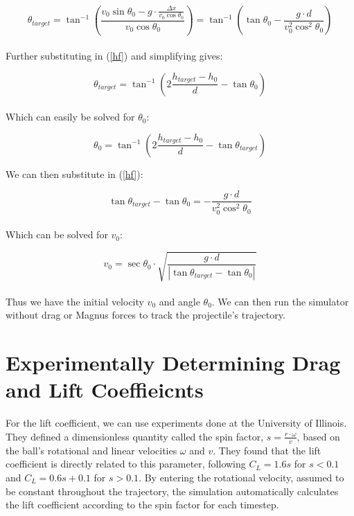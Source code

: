 \documentclass[a4paper]{article}
\begin{document}
	\begin{equation}
		\theta_{target} = \tan^{-1} \left( \frac{v_0 \sin \theta_0 - g \cdot \frac{\Delta x}{v_0 \cos \theta_0}}{v_0 \cos \theta_0} \right)
		 = \tan^{-1} \left( \tan \theta_0 - \frac{g \cdot d}{v_0^2 \cos^2 \theta_0} \right)
	\end{equation}
	\\
	Further substituting in (\ref{hf}) and simplifying gives:
	
	\begin{equation}
		\theta_{target} = \tan^{-1} \left( 2 \frac{h_{target} - h_0}{d} - \tan \theta_0 \right)
	\end{equation}
	\\
	Which can easily be solved for $ \theta_0 $:
	
	\begin{equation}
		\theta_0 = \tan^{-1} \left( 2 \frac{h_{target} - h_0}{d} - \tan \theta_{target} \right)
	\end{equation}
	
	\newpage
	We can then substitute in (\ref{hf}):
	
	\begin{equation}
		\tan \theta_{target} - \tan \theta_0 = - \frac{g \cdot d}{v_0^2 \cos^2 \theta_0}
	\end{equation}
	\\
	Which can be solved for $ v_0 $:
	
	\begin{equation}
		v_0 = \sec \theta_0 \cdot \sqrt{\frac{g \cdot d}{\left| \tan \theta_{target} - \tan \theta_0 \right|}}
	\end{equation}
	\\
	Thus we have the initial velocity $ v_0 $ and angle $ \theta_0 $. We can then run the simulator without drag or Magnus forces to track the projectile's trajectory.\\
	
	
	\section*{Experimentally Determining Drag and Lift Coeffieicnts}
	
	For the lift coefficient, we can use experiments done at the University of Illinois. They defined a dimensionless quantity called the spin factor, $ s = \frac{r \cdot \omega}{v} $, based on the ball's rotational and linear velocities $ \omega $ and $ v $. They found that the lift coefficient is directly related to this parameter, following $ C_L = 1.6 s $ for $ s < 0.1 $ and $ C_L = 0.6 s + 0.1 $ for $ s > 0.1 $. By entering the rotational velocity, assumed to be constant throughout the trajectory, the simulation automatically calculates the lift coefficient according to the spin factor for each timestep.\\
	
\end{document}
